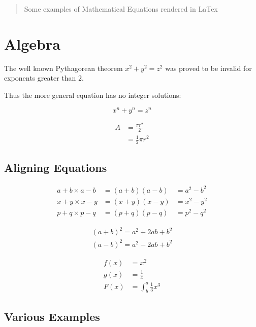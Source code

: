 \documentclass[]{article}
\title{}
\author{}
\begin{document}
\maketitle

\begin{abstract}
Some examples of Mathematical Equations rendered in LaTex
\end{abstract}


\section{Algebra}

The well known Pythagorean theorem \(x^2 + y^2 = z^2\) was 
proved to be invalid for exponents greater than $2$. 

Thus the more general equation has no integer solutions:

\[ x^n + y^n = z^n \]


\begin{equation} \label{eq1}
	\begin{split}
		A & = \frac{\pi r^2}{2} \\
		& = \frac{1}{2} \pi r^2
	\end{split}
\end{equation}

\subsection{Aligning Equations}

\begin{align*}
	a+b \times a-b  &=  (a+b)(a-b) &= a^2 - b^2 \\ 
	x+y \times x-y  &=  (x+y)(x-y) &= x^2 - y^2 \\
	p+q \times p-q  &=  (p+q)(p-q) &= p^2 - q^2
\end{align*}


\begin{gather*} 
	(a+b)^2 = a^2 + 2ab + b^2 \\ 
	(a-b)^2 = a^2 - 2ab + b^2
\end{gather*}

\begin{align*}
	f(x) &= x^2 \\
	g(x) &= \frac{1}{x} \\
	F(x) &= \int^a_b \frac{1}{3}x^3
\end{align*}

\subsection{Various Examples}
\end{document}
